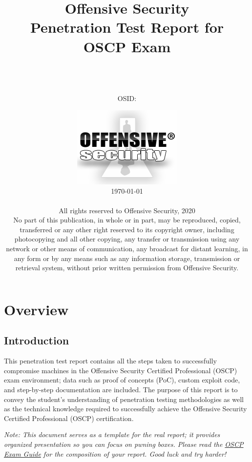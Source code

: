 \documentclass[a4paper, 10pt, oneside]{article}
\title{{\textbf{\Huge Offensive Security}}\\Penetration Test Report for\\OSCP Exam}
\author{\vspace{.8cm}\\{\LARGE \name}\\[1em]\email\\[1em]OSID: \osid}
\date{\vspace{1cm}\includegraphics{offsec_logo.png}\\\vspace{2cm} \today\\ \vspace{.25cm} \textcopyright\\\vspace{.25cm}
{\small All rights reserved to Offensive Security, 2020\\
No part of this publication, in whole or in part, may be reproduced, copied, transferred or any other right reserved to its copyright owner, including photocopying and all other copying, any transfer or transmission using any network or other means of communication, any broadcast for distant learning, in any form or by any means such as any information storage, transmission or retrieval system, without prior written permission from Offensive Security.}
}
\begin{document}
\maketitle
\thispagestyle{empty}
\tableofcontents
\thispagestyle{empty}
\pagebreak 

\newcommand{\hostname}{}
\newcommand{\ip}{}
\newcommand{\tcpports}{} 
\newcommand{\udpports}{} 
\newcommand{\os}{}
\newcommand{\vuln}{}
\newcommand{\product}{}
\newcommand{\vulnx}{}
\newcommand{\productx}{}
\newcommand{\client}{\textit{kali (ZZ.ZZ.ZZ.ZZ)}}

\section{Overview}
\subsection{Introduction}
This penetration test report contains all the steps taken to successfully compromise machines in the Offensive Security Certified Professional (OSCP) exam environment; data such as proof of concepts (PoC), custom exploit code, and step-by-step documentation are included. The purpose of this report is to convey the student's understanding of penetration testing methodologies as well as the technical knowledge required to successfully achieve the Offensive Security Certified Professional (OSCP) certification.

\textit{Note: This document serves as a template for the real report; it provides organized presentation so you can focus on pwning boxes. Please read the \href{https://support.offensive-security.com/oscp-exam-guide/}{OSCP Exam Guide} for the composition of your report. Good luck and try harder!}
\end{document}
